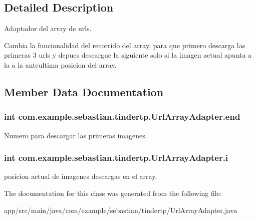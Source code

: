 \subsection{Detailed Description}
Adaptador del array de urls. 

Cambia la funcionalidad del recorrido del array, para que primero descarga las primeras 3 urls y depues descargue la siguiente solo si la imagen actual apunta a la a la anteultima posicion del array. 

\subsection{Member Data Documentation}
\subsubsection[{\texorpdfstring{end}{end}}]{\setlength{\rightskip}{0pt plus 5cm}int com.\+example.\+sebastian.\+tindertp.\+Url\+Array\+Adapter.\+end\hspace{0.3cm}{\ttfamily [private]}}\hypertarget{classcom_1_1example_1_1sebastian_1_1tindertp_1_1UrlArrayAdapter_a8417684fea5fdac9a0b1678f1be908c4}{}\label{classcom_1_1example_1_1sebastian_1_1tindertp_1_1UrlArrayAdapter_a8417684fea5fdac9a0b1678f1be908c4}
Numero para descargar las primeras imagenes. 
\subsubsection[{\texorpdfstring{i}{i}}]{\setlength{\rightskip}{0pt plus 5cm}int com.\+example.\+sebastian.\+tindertp.\+Url\+Array\+Adapter.\+i\hspace{0.3cm}{\ttfamily [private]}}\hypertarget{classcom_1_1example_1_1sebastian_1_1tindertp_1_1UrlArrayAdapter_a6808a701ca3d7424cca32e2fc4153eb4}{}\label{classcom_1_1example_1_1sebastian_1_1tindertp_1_1UrlArrayAdapter_a6808a701ca3d7424cca32e2fc4153eb4}
posicion actual de imagenes descargas en el array. 

The documentation for this class was generated from the following file\+:\begin{DoxyCompactItemize}
\item 
app/src/main/java/com/example/sebastian/tindertp/Url\+Array\+Adapter.\+java\end{DoxyCompactItemize}
